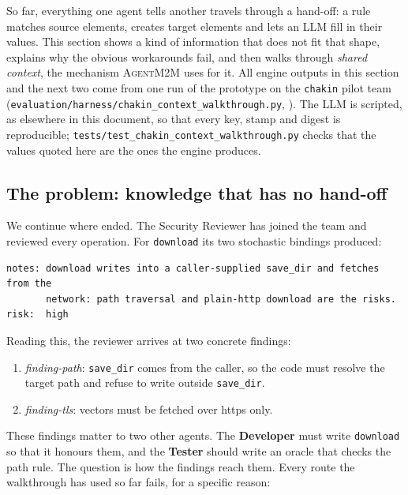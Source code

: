 \documentclass[10pt,a4paper]{article}
\newcommand{\tool}{\textsc{AgentM2M}}
\newcommand{\code}[1]{\texttt{#1}}
\newcommand{\file}[1]{\texttt{#1}}
\theoremstyle{definition}
\begin{document}
So far, everything one agent tells another travels through a hand-off: a
rule matches source elements, creates target elements and lets an LLM fill
in their values. This section shows a kind of information that does not fit
that shape, explains why the obvious workarounds fail, and then walks through
\emph{shared context}, the mechanism \tool{} uses for it. All engine outputs
in this section and the next two come from one run of the prototype on the
\texttt{chakin} pilot team
(\file{evaluation/harness/chakin_context_walkthrough.py}, ).
The LLM is scripted, as elsewhere in this document, so that every key, stamp
and digest is reproducible; \file{tests/test_chakin_context_walkthrough.py}
checks that the values quoted here are the ones the engine produces.

\subsection{The problem: knowledge that has no hand-off}\label{sec:context-why}

We continue where  ended. The Security Reviewer has joined the
team and reviewed every operation. For \code{download} its two stochastic
bindings produced:

\begin{lstlisting}[style=llm, caption={The Security Reviewer's review of \code{download} (footprint: the signature).}, label={lst:review}]
notes: download writes into a caller-supplied save_dir and fetches from the
       network: path traversal and plain-http download are the risks.
risk:  high
\end{lstlisting}

Reading this, the reviewer arrives at two concrete findings:
\begin{enumerate}[nosep]
\item \emph{finding-path}: \code{save_dir} comes from the caller, so the code
must resolve the target path and refuse to write outside \code{save_dir}.
\item \emph{finding-tls}: vectors must be fetched over https only.
\end{enumerate}
These findings matter to two other agents. The \textbf{Developer} must write
\code{download} so that it honours them, and the \textbf{Tester} should write
an oracle that checks the path rule. The question is how the findings reach
them. Every route the walkthrough has used so far fails, for a specific
reason:
\end{document}
